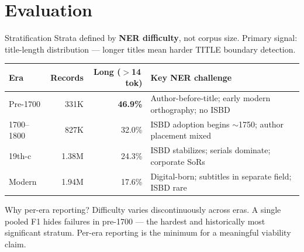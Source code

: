 \documentclass[xcolor,aspectratio=169,compress]{beamer}
\begin{document}
\section{Evaluation}

\begin{frame}{Stratification}
  \small
  Strata defined by \textbf{NER difficulty}, not corpus size.
  Primary signal: title-length distribution --- longer titles mean harder TITLE boundary detection.
  \smallskip
  \footnotesize
  \begin{tabular}{lrrl}
    \toprule
    Era & Records & Long ($>$14\,tok) & Key NER challenge \\
    \midrule
    Pre-1700   & 331K  & \textbf{46.9\%} & Author-before-title; early modern orthography; no ISBD \\
    1700--1800 & 827K  & 32.0\%          & ISBD adoption begins $\sim$1750; author placement mixed \\
    19th-c     & 1.38M & 24.3\%          & ISBD stabilizes; serials dominate; corporate SoRs \\
    Modern     & 1.94M & 17.6\%          & Digital-born; subtitles in separate field; ISBD rare \\
    \bottomrule
  \end{tabular}
  \smallskip
  \small
  \begin{block}{Why per-era reporting?}
    Difficulty varies discontinuously across eras. A single pooled F1 hides failures in pre-1700 ---
    the hardest and historically most significant stratum.
    Per-era reporting is the minimum for a meaningful viability claim.
  \end{block}
\end{frame}
\end{document}
